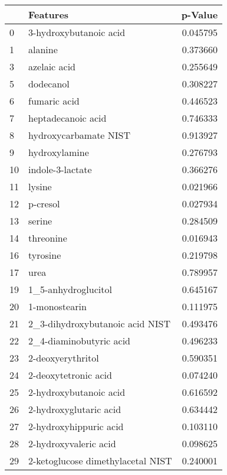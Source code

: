 \begin{tabular}{llr}
\toprule
{} &                           Features &   p-Value \\
\midrule
0   &             3-hydroxybutanoic acid &  0.045795 \\
1   &                            alanine &  0.373660 \\
3   &                       azelaic acid &  0.255649 \\
5   &                          dodecanol &  0.308227 \\
6   &                       fumaric acid &  0.446523 \\
7   &                 heptadecanoic acid &  0.746333 \\
8   &              hydroxycarbamate NIST &  0.913927 \\
9   &                      hydroxylamine &  0.276793 \\
10  &                   indole-3-lactate &  0.366276 \\
11  &                             lysine &  0.021966 \\
12  &                           p-cresol &  0.027934 \\
13  &                             serine &  0.284509 \\
14  &                          threonine &  0.016943 \\
16  &                           tyrosine &  0.219798 \\
17  &                               urea &  0.789957 \\
19  &                1\_5-anhydroglucitol &  0.645167 \\
20  &                      1-monostearin &  0.111975 \\
21  &    2\_3-dihydroxybutanoic acid NIST &  0.493476 \\
22  &            2\_4-diaminobutyric acid &  0.496233 \\
23  &                  2-deoxyerythritol &  0.590351 \\
24  &               2-deoxytetronic acid &  0.074240 \\
25  &             2-hydroxybutanoic acid &  0.616592 \\
26  &             2-hydroxyglutaric acid &  0.634442 \\
27  &             2-hydroxyhippuric acid &  0.103110 \\
28  &              2-hydroxyvaleric acid &  0.098625 \\
29  &  2-ketoglucose dimethylacetal NIST &  0.240001 \\

\end{tabular}
